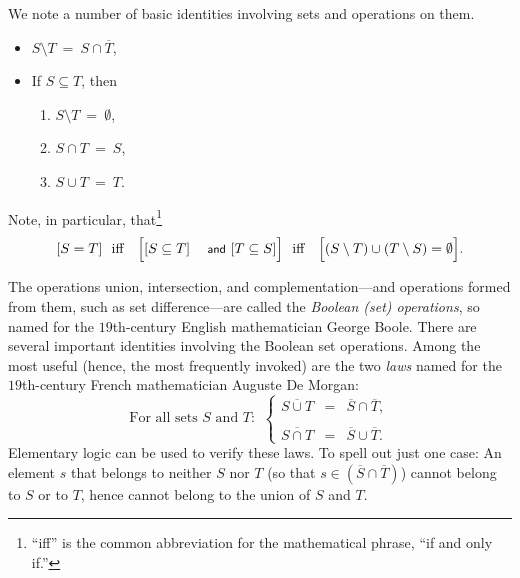 \bigskip

\noindent
We note a number of basic identities involving sets and operations on them.
\begin{itemize}
\item
$S \setminus T \ = \ S \cap \overline{T}$,
\item
If $S \subseteq T$, then
  \begin{enumerate}
  \item
$S \setminus T \ = \ \emptyset$,
  \item
$S \cap T \ = \ S$,
  \item
$S \cup T \ = \ T$.
  \end{enumerate}
\end{itemize}
Note, in particular, that\footnote{``iff'' is the common abbreviation for the mathematical phrase, ``if and only if.''}
\[ [S = T] \ \mbox{  iff  } \ \ \Bigl[[S \subseteq T] \mbox{
    {\small\sf and} } [T \subseteq S]\Bigr] \ \mbox{  iff  }
\ \ \Bigl[ (S \setminus T) \cup (T \setminus S) = \emptyset\Bigr].
\]

\medskip

 
 
 
The operations union, intersection, and complementation---and operations formed from them, such as set difference---are called the {\em Boolean (set) operations}, so named for the
$19$th-century English mathematician George Boole.  There are several important identities involving the Boolean set operations.  Among the most useful (hence, the most frequently invoked) are the two {\em laws} named for the $19$th-century French mathematician Auguste De Morgan:
\begin{equation}
\label{e.de-morgan}
\mbox{For all sets $S$ and $T$: } \ \left\{
\begin{array}{lcl}
\overline{S \cup T} & = & \overline{S} \cap \overline{T}, \\
 \\
\overline{S \cap T} & = & \overline{S} \cup \overline{T}.
\end{array}
\right.
\end{equation}
Elementary logic can be used to verify these laws.  To spell out just one case: An element $s$ that belongs to neither $S$ nor $T$ (so that $s \in \left(\overline{S} \cap \overline{T}\right)$) cannot belong to $S$ or to $T$, hence cannot belong to the union of $S$ and $T$.


